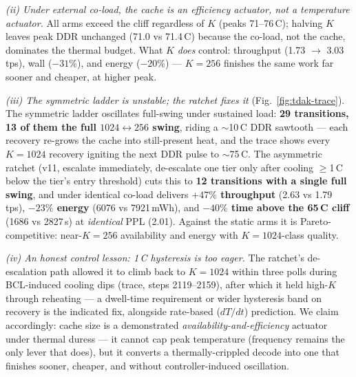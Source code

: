 \documentclass[sigconf, anonymous=false, screen=true]{acmart}
\newcommand{\good}[1]{\textcolor{endurkvgreen}{\textbf{#1}}}
\begin{document}
\emph{(ii) Under external co-load, the cache is an efficiency actuator, not a temperature actuator.} All arms exceed the cliff regardless of $K$ (peaks 71--76\,\textdegree C); halving $K$ leaves peak DDR unchanged (71.0 vs 71.4\,\textdegree C) because the co-load, not the cache, dominates the thermal budget. What $K$ \emph{does} control: throughput (1.73 $\to$ 3.03\,tps), wall ($-31\%$), and energy ($-20\%$) --- $K{=}256$ finishes the same work far sooner and cheaper, at higher peak.

\emph{(iii) The symmetric ladder is unstable; the ratchet fixes it} (Fig.~\ref{fig:tdak-trace}). The symmetric ladder oscillates full-swing under sustained load: \textbf{29 transitions, 13 of them the full $1024 \leftrightarrow 256$ swing}, riding a $\sim$10\,\textdegree C DDR sawtooth --- each recovery re-grows the cache into still-present heat, and the trace shows every $K{=}1024$ recovery igniting the next DDR pulse to $\sim$75\,\textdegree C. The asymmetric ratchet (v11, escalate immediately, de-escalate one tier only after cooling $\ge$1\,\textdegree C below the tier's entry threshold) cuts this to \textbf{12 transitions with a single full swing}, and under identical co-load delivers \good{$+47\%$ throughput} (2.63 vs 1.79\,tps), \good{$-23\%$ energy} (6076 vs 7921\,mWh), and \good{$-40\%$ time above the 65\,\textdegree C cliff} (1686 vs 2827\,s) at \emph{identical} PPL (2.01). Against the static arms it is Pareto-competitive: near-$K{=}256$ availability and energy with $K{=}1024$-class quality.

\emph{(iv) An honest control lesson: 1\,\textdegree C hysteresis is too eager.} The ratchet's de-escalation path allowed it to climb back to $K{=}1024$ within three polls during BCL-induced cooling dips (trace, steps 2119--2159), after which it held high-$K$ through reheating --- a dwell-time requirement or wider hysteresis band on recovery is the indicated fix, alongside rate-based ($dT/dt$) prediction. We claim accordingly: cache size is a demonstrated \emph{availability-and-efficiency} actuator under thermal duress --- it cannot cap peak temperature (frequency remains the only lever that does), but it converts a thermally-crippled decode into one that finishes sooner, cheaper, and without controller-induced oscillation.
\end{document}
